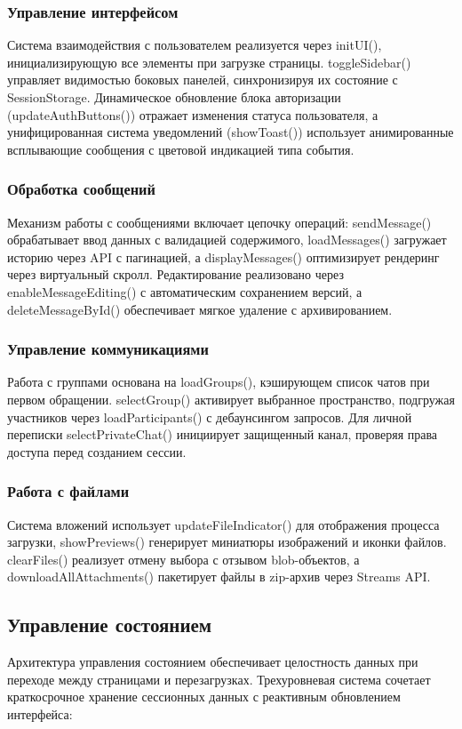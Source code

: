 \subsubsection{Управление интерфейсом}
Система взаимодействия с пользователем реализуется через initUI(), инициализирующую все элементы при загрузке страницы. toggleSidebar() управляет видимостью боковых панелей, синхронизируя их состояние с SessionStorage. Динамическое обновление блока авторизации (updateAuthButtons()) отражает изменения статуса пользователя, а унифицированная система уведомлений (showToast()) использует анимированные всплывающие сообщения с цветовой индикацией типа события.

\subsubsection{Обработка сообщений}
Механизм работы с сообщениями включает цепочку операций: sendMessage() обрабатывает ввод данных с валидацией содержимого, loadMessages() загружает историю через API с пагинацией, а displayMessages() оптимизирует рендеринг через виртуальный скролл. Редактирование реализовано через enableMessageEditing() с автоматическим сохранением версий, а deleteMessageById() обеспечивает мягкое удаление с архивированием.

\subsubsection{Управление коммуникациями}
	Работа с группами основана на loadGroups(), кэширующем список чатов при первом обращении. selectGroup() активирует выбранное пространство, подгружая участников через loadParticipants() с дебаунсингом запросов. Для личной переписки selectPrivateChat() инициирует защищенный канал, проверяя права доступа перед созданием сессии.
	
	\subsubsection{Работа с файлами}
		Система вложений использует updateFileIndicator() для отображения процесса загрузки, showPreviews() генерирует миниатюры изображений и иконки файлов. clearFiles() реализует отмену выбора с отзывом blob-объектов, а downloadAllAttachments() пакетирует файлы в zip-архив через Streams API.
		
\subsection{Управление состоянием}  
Архитектура управления состоянием обеспечивает целостность данных при переходе между страницами и перезагрузках. Трехуровневая система сочетает краткосрочное хранение сессионных данных с реактивным обновлением интерфейса:  

